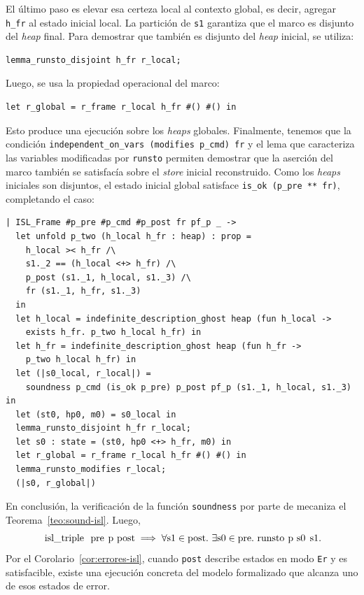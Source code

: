 \documentclass[a4paper,	11pt]{report}
\begin{document}
El último paso es elevar esa certeza local al contexto global,
es decir,
agregar \lstinline|h_fr| al estado inicial local.
La partición de \lstinline|s1| garantiza que el marco es disjunto del \emph{heap} final.
Para demostrar que también es disjunto del \emph{heap} inicial,
se utiliza:

\begin{lstlisting}
lemma_runsto_disjoint h_fr r_local;
\end{lstlisting}
Luego,
se usa la propiedad operacional del marco:

\begin{lstlisting}
let r_global = r_frame r_local h_fr #() #() in
\end{lstlisting}
Esto produce una ejecución sobre los \emph{heaps} globales.
Finalmente,
tenemos que la condición \lstinline|independent_on_vars (modifies p_cmd) fr|
y el lema que caracteriza las variables modificadas por \lstinline|runsto|
permiten demostrar que la aserción del marco también se satisfacía sobre el \emph{store} inicial reconstruido.
Como los \emph{heaps} iniciales son disjuntos,
el estado inicial global satisface \lstinline|is_ok (p_pre ** fr)|,
completando el caso:

\begin{lstlisting}
| ISL_Frame #p_pre #p_cmd #p_post fr pf_p _ ->
  let unfold p_two (h_local h_fr : heap) : prop = 
    h_local >< h_fr /\ 
    s1._2 == (h_local <+> h_fr) /\ 
    p_post (s1._1, h_local, s1._3) /\ 
    fr (s1._1, h_fr, s1._3)
  in
  let h_local = indefinite_description_ghost heap (fun h_local ->
    exists h_fr. p_two h_local h_fr) in
  let h_fr = indefinite_description_ghost heap (fun h_fr ->
    p_two h_local h_fr) in
  let (|s0_local, r_local|) = 
    soundness p_cmd (is_ok p_pre) p_post pf_p (s1._1, h_local, s1._3) in
  let (st0, hp0, m0) = s0_local in
  lemma_runsto_disjoint h_fr r_local;
  let s0 : state = (st0, hp0 <+> h_fr, m0) in
  let r_global = r_frame r_local h_fr #() #() in
  lemma_runsto_modifies r_local;
  (|s0, r_global|)
\end{lstlisting}

En conclusión,
la verificación de la función \lstinline|soundness| por parte de \fstar{} mecaniza el Teorema~\ref{teo:sound-isl}.
Luego,
$$\text{\lstinline|isl_triple pre p post|} \implies \forall \text{\lstinline|s1|} \in \text{\lstinline|post|}. \
\exists \text{\lstinline|s0|} \in \text{\lstinline|pre|}. \ \text{\lstinline|runsto p s0 s1|}.$$
Por el Corolario~\ref{cor:errores-isl},
cuando \lstinline|post| describe estados en modo \lstinline|Er| y es satisfacible,
existe una ejecución concreta del modelo formalizado que alcanza uno de esos estados de error.
\end{document}
